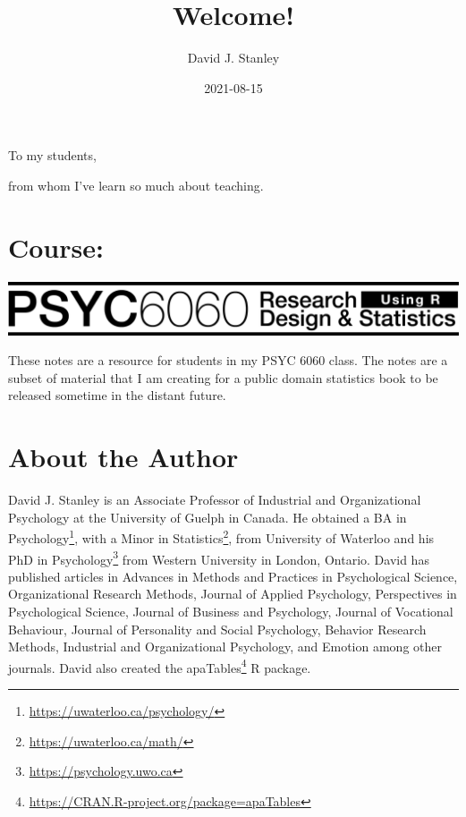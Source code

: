\documentclass[
]{krantz}
\title{Welcome!}
\author{David J. Stanley}
\date{2021-08-15}
\renewcommand{\href}[2]{#2\footnote{\url{#1}}}
\begin{document}
\maketitle


\thispagestyle{empty}

\begin{center}
To my students,

from whom I've learn so much about teaching.
\end{center}

\setlength{\abovedisplayskip}{-5pt}
\setlength{\abovedisplayshortskip}{-5pt}

{
\hypersetup{linkcolor=}
\setcounter{tocdepth}{2}
\tableofcontents
}
\listoftables
\listoffigures
\hypertarget{course}{%
\chapter*{Course:}\label{course}}


\includegraphics[width=1\linewidth]{header_6060}

These notes are a resource for students in my PSYC 6060 class. The notes are a subset of material that I am creating for a public domain statistics book to be released sometime in the distant future.

\hypertarget{about-the-author}{%
\chapter*{About the Author}\label{about-the-author}}


David J. Stanley is an Associate Professor of Industrial and Organizational Psychology at the University of Guelph in Canada. He obtained a BA in \href{https://uwaterloo.ca/psychology/}{Psychology}, with a Minor in \href{https://uwaterloo.ca/math/}{Statistics}, from University of Waterloo and his PhD in \href{https://psychology.uwo.ca}{Psychology} from Western University in London, Ontario. David has published articles in Advances in Methods and Practices in Psychological Science, Organizational Research Methods, Journal of Applied Psychology, Perspectives in Psychological Science, Journal of Business and Psychology, Journal of Vocational Behaviour, Journal of Personality and Social Psychology, Behavior Research Methods, Industrial and Organizational Psychology, and Emotion among other journals. David also created the \href{https://CRAN.R-project.org/package=apaTables}{apaTables} R package.
\end{document}
